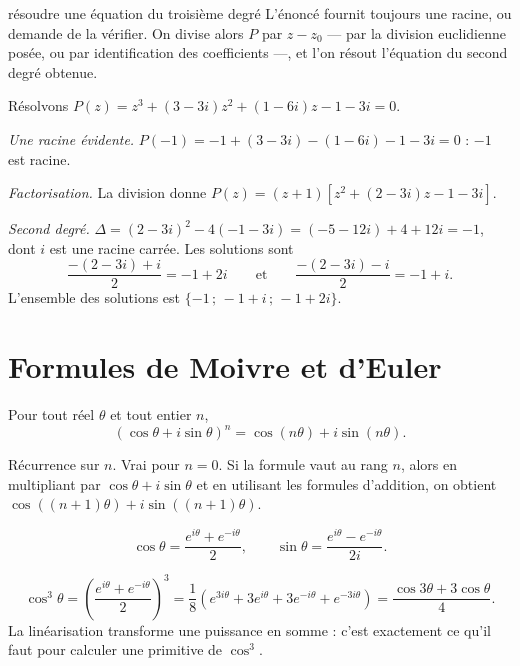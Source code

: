 \begin{methode}{résoudre une équation du troisième degré}
L'énoncé fournit toujours une racine, ou demande de la vérifier. On divise
alors $P$ par $z-z_{0}$ — par la division euclidienne posée, ou par
identification des coefficients —, et l'on résout l'équation du second degré
obtenue.
\end{methode}

\begin{exemple}
Résolvons $P(z) = z^{3}+(3-3i)z^{2}+(1-6i)z-1-3i = 0$.

\emph{Une racine évidente.}
$P(-1) = -1+(3-3i)-(1-6i)-1-3i = 0$ : $-1$ est racine.

\emph{Factorisation.} La division donne
$P(z) = (z+1)\left[z^{2}+(2-3i)z-1-3i\right]$.

\emph{Second degré.}
$\Delta = (2-3i)^{2}-4(-1-3i) = (-5-12i)+4+12i = -1$, dont $i$ est une racine
carrée. Les solutions sont
\[
  \frac{-(2-3i)+i}{2} = -1+2i
  \qquad\text{et}\qquad
  \frac{-(2-3i)-i}{2} = -1+i .
\]
L'ensemble des solutions est $\{-1\,;\,-1+i\,;\,-1+2i\}$.
\end{exemple}

\section{Formules de Moivre et d'Euler}

\begin{theoreme}
Pour tout réel $\theta$ et tout entier $n$,
\[
  \left(\cos\theta+i\sin\theta\right)^{n} = \cos(n\theta)+i\sin(n\theta).
\]
\end{theoreme}

\begin{demonstration}
Récurrence sur $n$. Vrai pour $n = 0$. Si la formule vaut au rang $n$, alors
en multipliant par $\cos\theta+i\sin\theta$ et en utilisant les formules
d'addition, on obtient $\cos((n+1)\theta)+i\sin((n+1)\theta)$.
\end{demonstration}

\begin{theoreme}
\[
  \cos\theta = \frac{e^{i\theta}+e^{-i\theta}}{2},
  \qquad
  \sin\theta = \frac{e^{i\theta}-e^{-i\theta}}{2i}.
\]
\end{theoreme}

\begin{exemple}
\[
  \cos^{3}\theta
  = \left(\frac{e^{i\theta}+e^{-i\theta}}{2}\right)^{3}
  = \frac18\left(e^{3i\theta}+3e^{i\theta}+3e^{-i\theta}+e^{-3i\theta}\right)
  = \frac{\cos3\theta+3\cos\theta}{4}.
\]
La linéarisation transforme une puissance en somme : c'est exactement ce
qu'il faut pour calculer une primitive de $\cos^{3}$.
\end{exemple}

